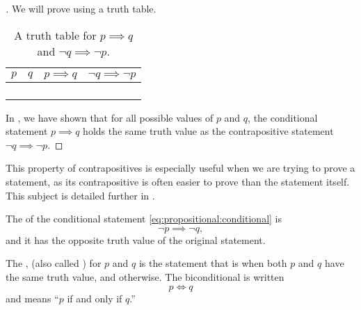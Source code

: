 \begin{proof}[]
  We will prove  using a truth table.
  \begin{table}[H]
    \centering
    \begin{tabular}{llrr}
      \toprule
      $p$ & $q$ & $p\implies q$ & $\neg q \implies \neg p$\\
      \midrule
      \lfalse{} & \lfalse{} & \ltrue{} & \ltrue{} \\
      \lfalse{} & \ltrue{} & \ltrue{} & \ltrue{} \\
      \ltrue{} & \lfalse{} & \lfalse{} & \lfalse{} \\
      \ltrue{} & \ltrue{} & \ltrue{} & \ltrue{} \\
      \bottomrule
    \end{tabular}
    \caption{A truth table for $p\implies q$ and $\neg q \implies \neg p$.}
    \label{tab:contrapositive}
  \end{table}
  In , we have shown that for all
  possible values of $p$ and $q$,
  the conditional statement $p \implies q$
  holds the same truth value as the contrapositive statement
  $\neg q \implies \neg p$.
\end{proof}

This property of contrapositives is especially useful when we are trying to prove a statement,
as its contrapositive is often easier to prove than the statement itself.
This subject is detailed further in .

\begin{defn}[inverse]
  The  of
  the conditional statement
  \eqref{eq:propositional:conditional}
  is
  \begin{equation}
    \neg p \implies \neg q,
    \label{eq:propositional:inverse}
  \end{equation}
  and it has the opposite truth value of the original statement.
\end{defn}

\begin{defn}
  The ,
  (also called )
  for $p$ and $q$ is the statement that is \ltrue{}
  when both $p$ and $q$ have the same truth value,
  and \lfalse{} otherwise.
  The biconditional is written
  \begin{equation}
    p \iff q
    \label{eq:propositional:biconditional}
  \end{equation}
  and means
  ``$p$ if and only if $q$.''
\end{defn}

